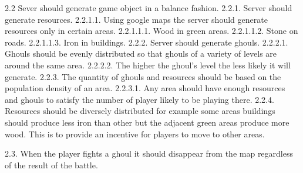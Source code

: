 \documentclass{article}
\newcommand{\forceindent}{\leavevmode{\parindent=1em\indent}}
\begin{document}
		\forceindent 2.2 Sever should generate game object in a balance fashion.\newline
		\forceindent \forceindent 2.2.1. Server should generate resources.\newline
		\forceindent \forceindent \forceindent 2.2.1.1. Using google maps the server should generate resources only in certain areas.\newline
		\forceindent \forceindent \forceindent \forceindent 2.2.1.1.1. Wood in green areas.\newline
		\forceindent \forceindent \forceindent \forceindent 2.2.1.1.2. Stone on roads.\newline
		\forceindent \forceindent \forceindent \forceindent 2.2.1.1.3. Iron in buildings.\newline
		\forceindent \forceindent 2.2.2. Server should generate ghouls.\newline
		\forceindent \forceindent \forceindent 2.2.2.1. Ghouls should be evenly distributed so that ghouls of a variety of levels are around the same area.\newline
		\forceindent \forceindent \forceindent 2.2.2.2. The higher the ghoul's level the less likely it will generate. \newline
		\forceindent \forceindent 2.2.3. The quantity of ghouls and resources should be based on the population density of an area.\newline
		\forceindent \forceindent \forceindent 2.2.3.1. Any area should have enough resources and ghouls to satisfy the number of player likely to be playing there. \newline
		\forceindent \forceindent 2.2.4. Resources should be diversely distributed for example some areas buildings should produce less iron than other but the adjacent green areas produce more wood. This is to provide an incentive for players to move to other areas. \newline
		
		\forceindent2.3. When the player fights a ghoul it should disappear from the map regardless of the result of the battle.\newline
		

\end{document}
